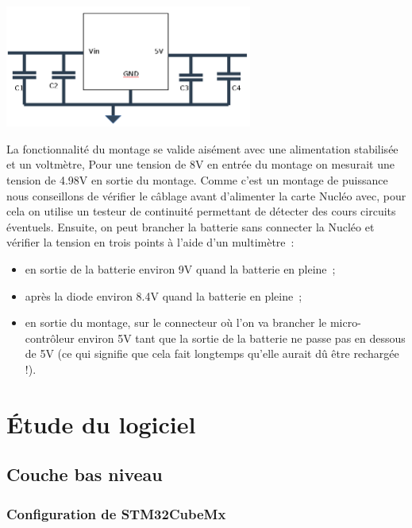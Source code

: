 \documentclass{article}
\begin{document}
\begin{center}
  \includegraphics[height=4cm]{alim.png}
\end{center}

La fonctionnalité du montage se valide aisément avec une alimentation stabilisée et un voltmètre, Pour une tension de 8V en entrée du montage on mesurait une tension de 4.98V en sortie du montage. Comme c'est un montage de puissance nous conseillons de vérifier le câblage avant d'alimenter la carte Nucléo avec, pour cela on utilise un testeur de continuité permettant de détecter des cours circuits éventuels. Ensuite, on peut brancher la batterie sans connecter la Nucléo et vérifier la tension en trois points à l'aide d'un multimètre~: \\

\begin{itemize}
  \item en sortie de la batterie environ 9V quand la batterie en pleine~;
  \item après la diode environ 8.4V quand la batterie en pleine~;
  \item en sortie du montage, sur le connecteur où l'on va brancher le micro-contrôleur environ 5V tant que la sortie de la batterie ne passe pas en dessous de 5V (ce qui signifie que cela fait longtemps qu'elle aurait dû être rechargée !).
\end{itemize} 

\section{Étude du logiciel}

\subsection{Couche bas niveau}

\subsubsection{Configuration de STM32CubeMx}
\end{document}
